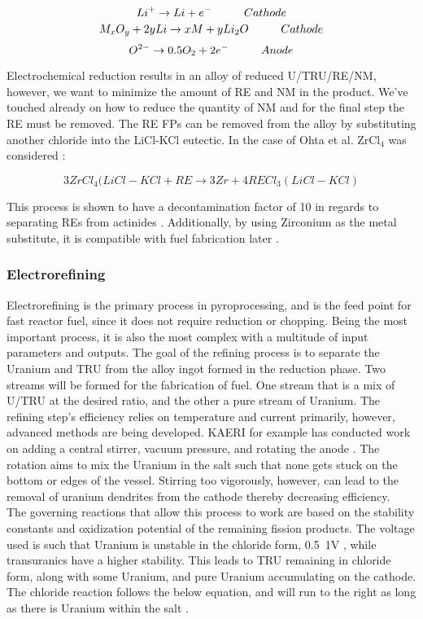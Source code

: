 \[ Li^+ \rightarrow Li + e^- \hspace{10mm} Cathode \]
\[ M_xO_y + 2yLi \rightarrow xM + yLi_2O \hspace{10mm} Cathode \]
\[ O^{2-} \rightarrow 0.5O_2 + 2e^- \hspace{10mm} Anode \]

Electrochemical reduction results in an alloy of reduced U/TRU/RE/NM, however, we want to minimize the amount of RE and NM in the product.
We've touched already on how to reduce the quantity of NM and for the final step the RE must be removed.
The RE FPs can be removed from the alloy by substituting another chloride into the LiCl-KCl eutectic.
In the case of Ohta et al. ZrCl$_4$ was considered \cite{ohta}:

\[ 3ZrCl_4(LiCl-KCl + RE \rightarrow 3Zr + 4RECl_3(LiCl-KCl) \]

This process is shown to have a decontamination factor of 10 in regards to separating REs from actinides \cite{sakamura}. Additionally, by using Zirconium as the metal substitute, it is compatible with fuel fabrication later \cite{ohta}.
\subsubsection{Electrorefining}
Electrorefining is the primary process in pyroprocessing, and is the feed point for fast reactor fuel, since it does not require reduction or chopping.
Being the most important process, it is also the most complex with a multitude of input parameters and outputs. 
The goal of the refining process is to separate the Uranium and TRU from the alloy ingot formed in the reduction phase.
Two streams will be formed for the fabrication of fuel. One stream that is a mix of U/TRU at the desired ratio, and the other a pure stream of Uranium.
The refining step's efficiency relies on temperature and current primarily, however, advanced methods are being developed.
KAERI for example has conducted work on adding a central stirrer, vacuum pressure, and rotating the anode \cite{lee_advanced}.
The rotation aims to mix the Uranium in the salt such that none gets stuck on the bottom or edges of the vessel. 
Stirring too vigorously, however, can lead to the removal of uranium dendrites from the cathode thereby decreasing efficiency.\\

The governing reactions that allow this process to work are based on the stability constants and oxidization potential of the remaining fission products.
The voltage used is such that Uranium is unstable in the chloride form, 0.5~1V \cite{organisation}, while transuranics have a higher stability. 
This leads to TRU remaining in chloride form, along with some Uranium, and pure Uranium accumulating on the cathode.
The chloride reaction follows the below equation, and will run to the right as long as there is Uranium within the salt \cite{organisation}.

